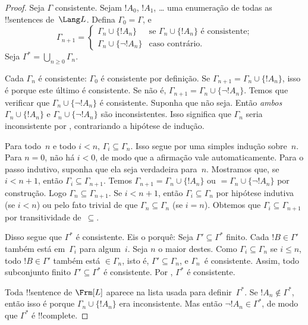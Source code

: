 \documentclass[../../../include/open-logic-section]{subfiles}
\begin{document}
\begin{proof}
Seja $\Gamma$ consistente.  Sejam $!A_0$, $!A_1$,
\dots{} uma enumeração de todas as !!{sentence}s de~$\Lang L$.
Defina $\Gamma_0 = \Gamma$, e
\[
\Gamma_{n+1} =
\begin{cases}
\Gamma_n \cup \{ !A_n \} & \textrm{se $\Gamma_n \cup \{!A_n\}$ é
  consistente;} \\
\Gamma_n \cup \{ \lnot !A_n \} & \textrm{caso contrário.}
\end{cases}
\]
Seja $\Gamma^* = \bigcup_{n \geq 0} \Gamma_n$.

Cada $\Gamma_n$ é consistente: $\Gamma_0$ é consistente por definição.
Se $\Gamma_{n+1} = \Gamma_n \cup \{!A_n\}$, isso é porque este último
é consistente.  Se não é, $\Gamma_{n+1} = \Gamma_n \cup \{\lnot
!A_n\}$. Temos que verificar que $\Gamma_n \cup \{\lnot !A_n\}$ é
consistente. Suponha que não seja. Então \emph{ambos} $\Gamma_n \cup
\{!A_n\}$ e $\Gamma_n \cup \{\lnot !A_n\}$ são inconsistentes.  Isso
significa que $\Gamma_n$ seria inconsistente por
,
contrariando a hipótese de indução.

Para todo~$n$ e todo $i < n$, $\Gamma_i \subseteq \Gamma_n$. Isso
segue por uma simples indução sobre~$n$. Para $n=0$, não há $i < 0$,
de modo que a afirmação vale automaticamente.  Para o passo indutivo, suponha que ela
seja verdadeira para~$n$. Mostramos que, se $i < n+1$, então $\Gamma_i \subseteq
\Gamma_{n+1}$. Temos $\Gamma_{n+1} = \Gamma_n \cup \{!A_n\}$ ou $=
\Gamma_n \cup \{\lnot !A_n\}$ por construção. Logo $\Gamma_n \subseteq
\Gamma_{n+1}$. Se $i < n+1$, então $\Gamma_i \subseteq \Gamma_n$ por
hipótese indutiva (se $i < n$) ou pelo fato trivial de que $\Gamma_n
\subseteq \Gamma_n$ (se $i = n$). Obtemos que $\Gamma_i \subseteq
\Gamma_{n+1}$ por transitividade de~$\subseteq$.

Disso segue que $\Gamma^*$ é consistente. Eis o porquê: Seja
$\Gamma' \subseteq \Gamma^*$ finito. Cada $!B \in \Gamma'$ também está
em~$\Gamma_i$ para algum~$i$. Seja $n$ o maior destes. Como
$\Gamma_i \subseteq \Gamma_n$ se $i \le n$, todo $!B \in \Gamma'$ também está
$\in \Gamma_n$, isto é, $\Gamma' \subseteq \Gamma_n$, e
$\Gamma_n$~é consistente. Assim, todo subconjunto finito $\Gamma' \subseteq
\Gamma^*$ é consistente. Por , $\Gamma^*$ é
  consistente.

Toda !!{sentence} de $\Frm[L]$ aparece na lista usada para
definir~$\Gamma^*$. Se $!A_n \notin \Gamma^*$, então isso é porque
$\Gamma_n \cup \{!A_n\}$ era inconsistente.  Mas então $\lnot !A_n
\in \Gamma^*$, de modo que $\Gamma^*$ é !!{complete}.
\end{proof}
\end{document}
